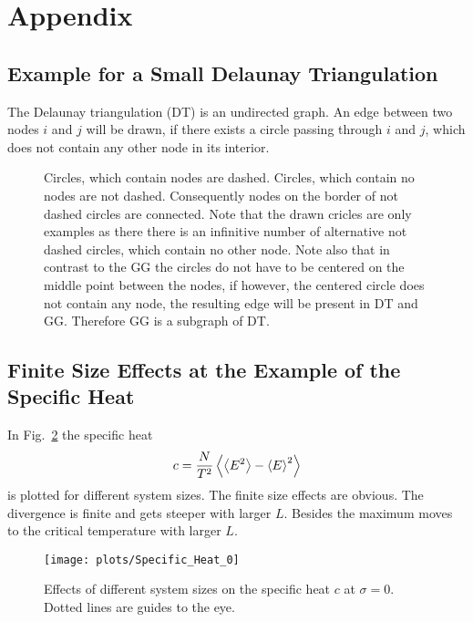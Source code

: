 \section{Appendix}
\subsection{Example for a Small Delaunay Triangulation}
\label{appendix:DT_def}
    The Delaunay triangulation (DT) is an undirected graph. An edge
    between two nodes \(i\) and \(j\) will be drawn, if there exists
    a circle passing through \(i\) and \(j\), which does not contain
    any other node in its interior.
    \begin{figure}[htbp]
    \centering
        
        \label{sfig:def:DT}
        \caption[Example for a Small Delaunay Triangulation]
        {
            Circles, which contain nodes are dashed.
            Circles, which contain no nodes are not dashed.
            Consequently nodes on the border of not dashed circles are
            connected. Note that the drawn cricles are only examples
            as there there is an infinitive number of alternative not
            dashed circles, which contain no other node.
            Note also that in contrast to the GG the circles do not
            have to be centered on the middle point between the nodes, if
            however, the centered circle does not contain any node, the
            resulting edge will be present in DT and GG. Therefore GG is
            a subgraph of DT.
        }
    \end{figure}

\subsection{Finite Size Effects at the Example of the Specific Heat}
\label{appendix:finiteSizeEffects}
    In Fig.\ \ref{fig:smeared_out_appendix} the specific heat
    \begin{equation}
        c = \frac{N}{T^2}\left< \left< E^2 \right> - \left< E \right>^2 \right>
    \end{equation}
    is plotted for different system sizes. The finite size effects are obvious.
    The divergence is finite and gets steeper with larger \(L\). Besides
    the maximum moves to the critical temperature with larger \(L\).
    \begin{figure}[htbp]
        \centering
        \texttt{[image: plots/Specific\_Heat\_0]}
        \caption[Finite Size Effects by Example of the Specific Heat]
        {
            Effects of different system sizes on the specific heat \(c\)
            at \(\sigma = 0\). Dotted lines are guides to the eye.
        }
        \label{fig:smeared_out_appendix}
    \end{figure}

